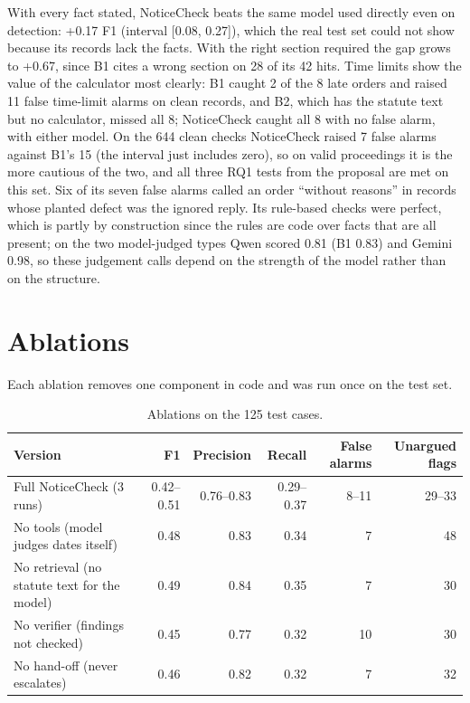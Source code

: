 \documentclass[10pt,a4paper]{article}
\begin{document}
With every fact stated, NoticeCheck beats the same model used directly even on detection: +0.17 F1 (interval [0.08, 0.27]), which the real test set could not show because its records lack the facts. With the right section required the gap grows to +0.67, since B1 cites a wrong section on 28 of its 42 hits. Time limits show the value of the calculator most clearly: B1 caught 2 of the 8 late orders and raised 11 false time-limit alarms on clean records, and B2, which has the statute text but no calculator, missed all 8; NoticeCheck caught all 8 with no false alarm, with either model. On the 644 clean checks NoticeCheck raised 7 false alarms against B1's 15 (the interval just includes zero), so on valid proceedings it is the more cautious of the two, and all three RQ1 tests from the proposal are met on this set. Six of its seven false alarms called an order ``without reasons'' in records whose planted defect was the ignored reply. Its rule-based checks were perfect, which is partly by construction since the rules are code over facts that are all present; on the two model-judged types Qwen scored 0.81 (B1 0.83) and Gemini 0.98, so these judgement calls depend on the strength of the model rather than on the structure.

\section{Ablations}

Each ablation removes one component in code and was run once on the test set.

\begin{table}[H]
\centering\small
\begin{tabular}{l rrr rr}
\toprule
Version & F1 & Precision & Recall & False alarms & Unargued flags \\
\midrule
Full NoticeCheck (3 runs) & 0.42--0.51 & 0.76--0.83 & 0.29--0.37 & 8--11 & 29--33 \\
No tools (model judges dates itself) & 0.48 & 0.83 & 0.34 & 7 & 48 \\
No retrieval (no statute text for the model) & 0.49 & 0.84 & 0.35 & 7 & 30 \\
No verifier (findings not checked) & 0.45 & 0.77 & 0.32 & 10 & 30 \\
No hand-off (never escalates) & 0.46 & 0.82 & 0.32 & 7 & 32 \\
\bottomrule
\end{tabular}
\caption{Ablations on the 125 test cases.}
\end{table}
\end{document}
